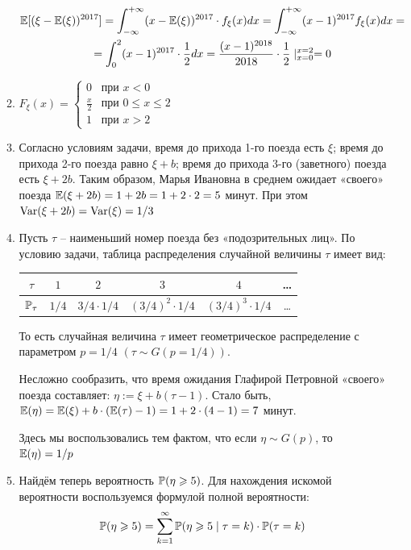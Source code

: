 \documentclass[12pt, a4paper]{article}\usepackage[]{graphicx}\usepackage[]{color}
\begin{document}
\begin{enumerate}
\begin{enumerate}
\begin{multline*}
								\E [ (\xi - \E(\xi))^{2017} ] = \int_{-\infty}^{+\infty} (x- \E(\xi) )^{2017} \cdot f_{\xi} (x) dx = \int_{-\infty}^{+\infty} (x-1)^{2017} f_{\xi} (x) dx = \\
								= \int_{0}^{2} (x-1)^{2017} \cdot \frac{1}{2} dx = \frac{(x-1)^{2018}}{2018} \cdot \frac{1}{2} \mid_{x=0}^{x=2} =0
								\end{multline*}
								\item $F_{\xi} (x) =
								\begin{cases}
								0 & \text{при } x < 0 \\
								\frac{x}{2} & \text{при } 0 \leq x \leq 2 \\
								1 & \text{при } x > 2
								\end{cases}
								$
								\item Согласно условиям задачи, время до прихода 1-го поезда есть $\xi$; время до прихода 2-го поезда равно $\xi + b$; время до прихода 3-го (заветного) поезда есть $\xi + 2b$. Таким образом, Марья Ивановна в среднем ожидает «своего» поезда $\E (\xi + 2b) = 1 + 2b = 1 + 2 \cdot 2 = 5 $ минут. При этом $\Var (\xi + 2b) = \Var (\xi) = 1/3$
								\item Пусть $\tau$ – наименьший номер поезда без «подозрительных лиц». По условию задачи, таблица распределения случайной величины $\tau$ имеет вид:

								\begin{tabular}{c|ccccc}
									$\tau$ & $ 1 $ & $2$ & $3$ & $4$ & \ldots \\
									\hline
									$\P_{\tau}$ & $1/4$ & $3/4\cdot1/4$ & $(3/4)^2 \cdot 1/4$ & $(3/4)^3 \cdot 1/4$ & \ldots\\
								\end{tabular}

								То есть случайная величина $\tau$ имеет геометрическое распределение с параметром $p=1/4$ $(\tau \sim G(p=1/4))$.

								Несложно сообразить, что время ожидания Глафирой Петровной «своего» поезда составляет: $\eta := \xi + b(\tau- 1)$. Стало быть, $\E (\eta) = \E (\xi) + b \cdot (\E(\tau)-1)  = 1 + 2 \cdot (4-1) = 7$ минут.

								Здесь мы воспользовались тем фактом, что если $\eta \sim G(p)$, то $\E (\eta) = 1/p$
								\item Найдём теперь вероятность $\P (\eta \geq 5 )$. Для нахождения искомой вероятности воспользуемся формулой полной вероятности:
								\[
								\P (\eta \geq 5 ) = \sum_{k=1}^{\infty} \P ( \eta \geq 5   \mid \tau = k ) \cdot \P(\tau = k )
								\]


\end{enumerate}
\end{enumerate}
\end{document}
